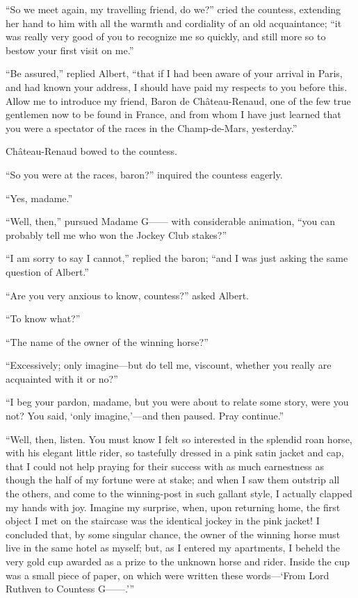 “So we meet again, my travelling friend, do we?” cried the countess,
extending her hand to him with all the warmth and cordiality of an old
acquaintance; “it was really very good of you to recognize me so
quickly, and still more so to bestow your first visit on me.”

“Be assured,” replied Albert, “that if I had been aware of your arrival
in Paris, and had known your address, I should have paid my respects to
you before this. Allow me to introduce my friend, Baron de
Château-Renaud, one of the few true gentlemen now to be found in
France, and from whom I have just learned that you were a spectator of
the races in the Champ-de-Mars, yesterday.”

Château-Renaud bowed to the countess.

“So you were at the races, baron?” inquired the countess eagerly.

“Yes, madame.”

“Well, then,” pursued Madame G—— with considerable animation, “you can
probably tell me who won the Jockey Club stakes?”

“I am sorry to say I cannot,” replied the baron; “and I was just asking
the same question of Albert.”

“Are you very anxious to know, countess?” asked Albert.

“To know what?”

“The name of the owner of the winning horse?”

“Excessively; only imagine—but do tell me, viscount, whether you really
are acquainted with it or no?”

“I beg your pardon, madame, but you were about to relate some story,
were you not? You said, ‘only imagine,’—and then paused. Pray
continue.”

“Well, then, listen. You must know I felt so interested in the splendid
roan horse, with his elegant little rider, so tastefully dressed in a
pink satin jacket and cap, that I could not help praying for their
success with as much earnestness as though the half of my fortune were
at stake; and when I saw them outstrip all the others, and come to the
winning-post in such gallant style, I actually clapped my hands with
joy. Imagine my surprise, when, upon returning home, the first object I
met on the staircase was the identical jockey in the pink jacket! I
concluded that, by some singular chance, the owner of the winning horse
must live in the same hotel as myself; but, as I entered my apartments,
I beheld the very gold cup awarded as a prize to the unknown horse and
rider. Inside the cup was a small piece of paper, on which were written
these words—‘From Lord Ruthven to Countess G——.’”

